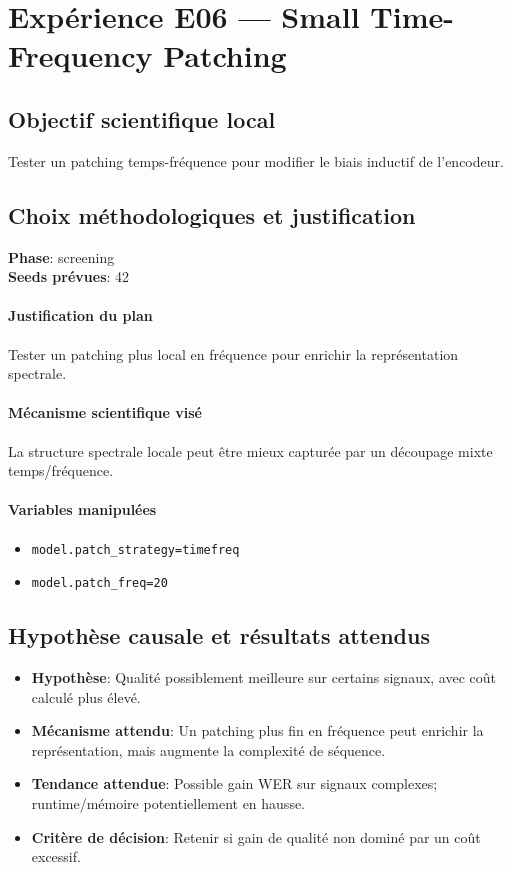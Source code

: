 \documentclass[11pt,a4paper]{article}
\begin{document}
\section{Expérience E06 --- Small Time-Frequency Patching}
\subsection{Objectif scientifique local}
Tester un patching temps-fréquence pour modifier le biais inductif de l'encodeur.

\subsection{Choix méthodologiques et justification}
\textbf{Phase}: screening\\
\textbf{Seeds prévues}: 42\\


\paragraph{Justification du plan}
Tester un patching plus local en fréquence pour enrichir la représentation spectrale.

\paragraph{Mécanisme scientifique visé}
La structure spectrale locale peut être mieux capturée par un découpage mixte temps/fréquence.

\paragraph{Variables manipulées}
\begin{itemize}
\item \texttt{model.patch\_strategy=timefreq}
\item \texttt{model.patch\_freq=20}
\end{itemize}

\subsection{Hypothèse causale et résultats attendus}
\begin{itemize}[leftmargin=1.2cm]
\item \textbf{Hypothèse}: Qualité possiblement meilleure sur certains signaux, avec coût calculé plus élevé.
\item \textbf{Mécanisme attendu}: Un patching plus fin en fréquence peut enrichir la représentation, mais augmente la complexité de séquence.
\item \textbf{Tendance attendue}: Possible gain WER sur signaux complexes; runtime/mémoire potentiellement en hausse.
\item \textbf{Critère de décision}: Retenir si gain de qualité non dominé par un coût excessif.
\end{itemize}
\end{document}
